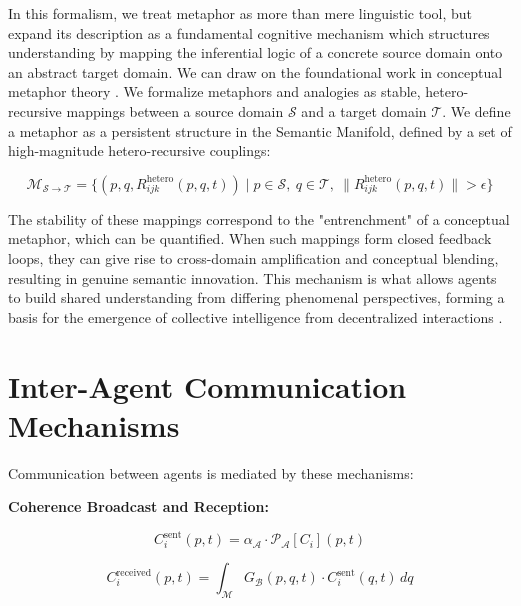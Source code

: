 In this formalism, we treat metaphor as more than mere linguistic tool, but expand its description as a fundamental cognitive mechanism which structures understanding by mapping the inferential logic of a concrete source domain onto an abstract target domain. We can draw on the foundational work in conceptual metaphor theory \autocite{LakoffJohnson1980, HofstadterSander2013}. We formalize metaphors and analogies as stable, hetero-recursive mappings between a source domain \(\mathcal{S}\) and a target domain \(\mathcal{T}\). We define a metaphor as a persistent structure in the Semantic Manifold, defined by a set of high-magnitude hetero-recursive couplings:

\begin{equation}
\mathcal{M}_{\mathcal{S} \to \mathcal{T}} = \{(p, q, R_{ijk}^{\text{hetero}}(p, q, t)) \mid p \in \mathcal{S},\ q \in \mathcal{T},\ \|R_{ijk}^{\text{hetero}}(p, q, t)\| > \epsilon\}
\end{equation}

The stability of these mappings correspond to the "entrenchment" of a conceptual metaphor, which can be quantified. When such mappings form closed feedback loops, they can give rise to cross-domain amplification and conceptual blending, resulting in genuine semantic innovation. This mechanism is what allows agents to build shared understanding from differing phenomenal perspectives, forming a basis for the emergence of collective intelligence from decentralized interactions \autocite{Surowiecki2004}.


\section{Inter-Agent Communication Mechanisms}
\label{sec:inter_agent_communication_mechanisms}

Communication between agents is mediated by these mechanisms:

\textbf{Coherence Broadcast and Reception:}

\begin{equation}
C_i^{\mathrm{sent}}(p,t) = \alpha_{\mathcal{A}} \cdot \mathcal{P}_{\mathcal{A}}[C_i](p,t)
\end{equation}

\begin{equation}
C_i^{\mathrm{received}}(p,t) = \int_{\mathcal{M}} G_{\mathcal{B}}(p,q,t) \cdot C_i^{\mathrm{sent}}(q,t) \, dq
\end{equation}

